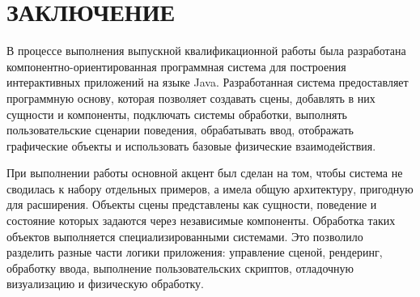 \section*{ЗАКЛЮЧЕНИЕ}

В процессе выполнения выпускной квалификационной работы была разработана
компонентно-ориентированная программная система для построения интерактивных
приложений на языке Java. Разработанная система предоставляет программную
основу, которая позволяет создавать сцены, добавлять в них сущности и
компоненты, подключать системы обработки, выполнять пользовательские сценарии
поведения, обрабатывать ввод, отображать графические объекты и использовать
базовые физические взаимодействия.

При выполнении работы основной акцент был сделан на том, чтобы система не
сводилась к набору отдельных примеров, а имела общую архитектуру, пригодную для
расширения. Объекты сцены представлены как сущности, поведение и состояние
которых задаются через независимые компоненты. Обработка таких объектов
выполняется специализированными системами. Это позволило разделить разные
части логики приложения: управление сценой, рендеринг, обработку ввода,
выполнение пользовательских скриптов, отладочную визуализацию и физическую
обработку.

